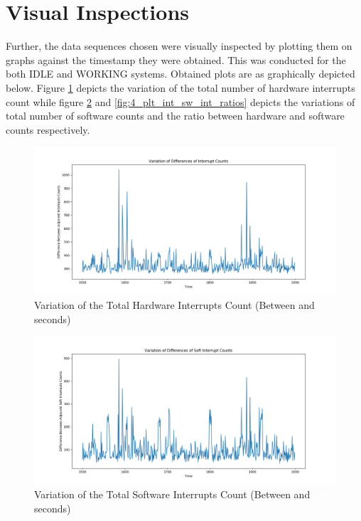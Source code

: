 \section{Visual Inspections}

Further, the data sequences chosen were visually inspected by plotting them on graphs against the timestamp they were obtained. This was conducted for the both IDLE and WORKING systems. Obtained plots are as graphically depicted below. Figure \ref{fig:4_plt_int_counts} depicts the variation of the total number of hardware interrupts count while figure \ref{fig:4_plt_sw_int_counts} and \ref{fig:4_plt_int_sw_int_ratios} depicts the variations of total number of software counts and the ratio between hardware and software counts respectively.

\begin{figure}[h!]
    \includegraphics[width=1.0\textwidth]{images/PLT_ADJ_INTERRUPTS_DIFFERENCES_IDLE_1500_500.png}
    \centering
    \caption{Variation of the Total Hardware Interrupts Count (Between  and  seconds)}
    \label{fig:4_plt_int_counts}
\end{figure}

\begin{figure}[h!]
    \includegraphics[width=1.0\textwidth]{images/PLT_ADJ_SOFT_INTERRUPTS_DIFFERENCES_IDLE_1500_500.png}
    \centering
    \caption{Variation of the Total Software Interrupts Count (Between  and  seconds)}
    \label{fig:4_plt_sw_int_counts}
\end{figure}

